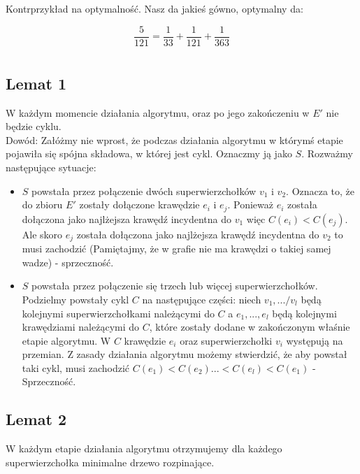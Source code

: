 \noindent Kontrprzykład na optymalność. Nasz da jakieś gówno, optymalny da:

\[\frac{5}{121}=\frac{1}{33}+\frac{1}{121}+\frac{1}{363}\]

\section{}%

\subsection{Lemat 1}
\noindent W każdym momencie działania algorytmu, oraz po jego zakończeniu w $E'$ nie będzie cyklu.\\

\noindent Dowód: Załóżmy nie wprost, że podczas działania algorytmu w którymś etapie pojawiła się spójna składowa, w której jest cykl. Oznaczmy ją jako $S$. Rozważmy następujące sytuacje:\\

\begin{itemize}
\item $S$ powstała przez połączenie dwóch superwierzchołków $v_1$ i $v_2$. Oznacza to, że do zbioru $E'$ zostały dołączone krawędzie $e_i$ i $e_j$. Ponieważ $e_i$ została dołączona jako najlżejsza krawędź incydentna do $v_1$ więc $C(e_i) < C(e_j)$. Ale skoro $e_j$ została dołączona jako najlżejsza krawędź incydentna do $v_2$ to musi zachodzić  (Pamiętajmy, że w grafie nie ma krawędzi o takiej samej wadze) - sprzeczność.

\item $S$ powstała przez połączenie się trzech lub więcej superwierzchołków. Podzielmy powstały cykl $C$ na następujące części: niech $v_1,.../v_l$ będą kolejnymi superwierzchołkami należącymi do $C$ a $e_1,...,e_l$ będą kolejnymi krawędziami należącymi do $C$, które zostały dodane w zakończonym właśnie etapie algorytmu. W $C$ krawędzie $e_i$ oraz superwierzchołki $v_i$ występują na przemian. Z zasady działania algorytmu możemy stwierdzić, że aby powstał taki cykl, musi zachodzić $C(e_1) < C(e_2) ... < C(e_l) < C(e_1)$ - Sprzeczność.
\end{itemize}

\subsection{Lemat 2}

\noindent W każdym etapie działania algorytmu otrzymujemy dla każdego superwierzchołka minimalne drzewo rozpinające.\\

